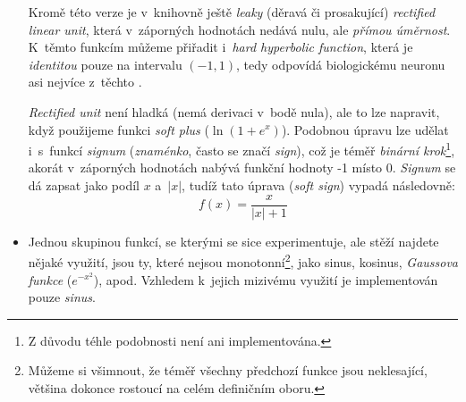 \documentclass[12pt]{report}			%
\begin{document}
\begin{itemize}
						Kromě této verze je v~knihovně ještě \emph{leaky} (děravá či prosakující) \emph{rectified linear unit}, která v~záporných hodnotách nedává nulu, ale \emph{přímou úměrnost}. K~těmto funkcím můžeme přiřadit i~\emph{hard hyperbolic function}, která je \emph{identitou} pouze na intervalu $(-1, 1)$, tedy odpovídá biologickému neuronu asi nejvíce z~těchto .
						
						\emph{Rectified unit} není hladká (nemá derivaci v~bodě nula), ale to lze napravit, když použijeme funkci \emph{soft plus} ($\ln\left(1+e^x\right)$). Podobnou úpravu lze udělat i~s~funkcí \emph{signum} (\emph{znaménko}, často se značí \emph{sign}), což je téměř \emph{binární krok}\footnote{Z důvodu téhle podobnosti není ani implementována.}, akorát v~záporných hodnotách nabývá funkční hodnoty -1 místo 0. \emph{Signum} se dá zapsat jako podíl $x$ a~$|x|$, tudíž tato úprava (\emph{soft sign}) vypadá následovně:
						\begin{equation} f(x) = \frac{x}{|x| + 1} \end{equation}
						
					\item Jednou skupinou funkcí, se kterými se sice experimentuje, ale stěží najdete nějaké využití, jsou ty, které nejsou monotonní\footnote{Můžeme si všimnout, že téměř všechny předchozí funkce jsou neklesající, většina dokonce rostoucí na celém definičním oboru.}, jako sinus, kosinus, \emph{Gaussova funkce} ($e^{-x^2}$), apod. Vzhledem k~jejich mizivému využití je implementován pouze \emph{sinus}.
					

\end{itemize}
\end{document}
